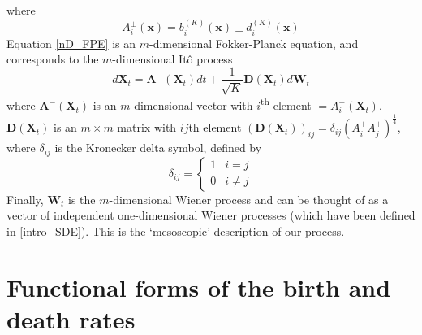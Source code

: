 where
\begin{equation*}
A_{i}^{\pm}(\mathbf{x}) = b^{(K)}_i(\mathbf{x})\pm d^{(K)}_i(\mathbf{x})
\end{equation*}
Equation \eqref{nD_FPE} is an $m$-dimensional Fokker-Planck equation, and corresponds to the $m$-dimensional It\^o process
\begin{equation}
\label{nD_Ito_SDE}
d\mathbf{X}_{t} = \mathbf{A^-}(\mathbf{X}_t)dt + \frac{1}{\sqrt{K}}\mathbf{D}(\mathbf{X}_t)d\mathbf{W}_t
\end{equation}
where $\mathbf{A^-}(\mathbf{X}_t)$ is an $m$-dimensional vector with $i$\textsuperscript{th} element $ = A^{-}_{i}(\mathbf{X}_t)$. $\mathbf{D}(\mathbf{X}_t)$ is an $m \times m$ matrix with $ij$th element $\left(\mathbf{D}(\mathbf{X}_t)\right)_{ij} = \delta_{ij}\left(A^{+}_{i}A^{+}_{j}\right)^{\frac{1}{4}}$, where $\delta_{ij}$ is the Kronecker delta symbol, defined by
\begin{equation*}
\delta_{ij} = 
\begin{cases}
1 & i=j\\
0 & i\neq j
\end{cases}
\end{equation*}
Finally, $\mathbf{W}_t$ is the $m$-dimensional Wiener process and can be thought of as a vector of independent one-dimensional Wiener processes (which have been defined in \ref{intro_SDE}). This is the `mesoscopic' description of our process.

\section{Functional forms of the birth and death rates}

